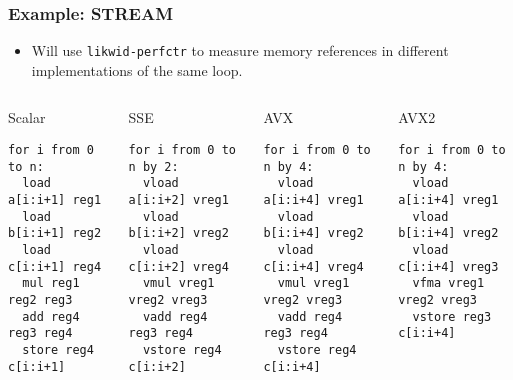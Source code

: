 \documentclass[presentation,aspectratio=43,10pt]{beamer}
\begin{document}
\begin{frame}[fragile]
  \frametitle{Example: STREAM}
  \begin{itemize}
  \item Will use \texttt{likwid-perfctr} to measure memory references
    in different implementations of the same loop.
  \end{itemize}
  \begin{columns}[t]
    \begin{column}{0.25\textwidth}
      \begin{block}{Scalar}
\begin{verbatim}
for i from 0 to n:
  load a[i:i+1] reg1
  load b[i:i+1] reg2
  load c[i:i+1] reg4
  mul reg1 reg2 reg3
  add reg4 reg3 reg4
  store reg4 c[i:i+1]
\end{verbatim}
      \end{block}
    \end{column}
    \begin{column}{0.25\textwidth}
      \begin{block}{SSE}
\begin{verbatim}
for i from 0 to n by 2:
  vload a[i:i+2] vreg1
  vload b[i:i+2] vreg2
  vload c[i:i+2] vreg4
  vmul vreg1 vreg2 vreg3
  vadd reg4 reg3 reg4
  vstore reg4 c[i:i+2]
\end{verbatim}
      \end{block}
    \end{column}
    \begin{column}{0.25\textwidth}
      \begin{block}{AVX}
\begin{verbatim}
for i from 0 to n by 4:
  vload a[i:i+4] vreg1
  vload b[i:i+4] vreg2
  vload c[i:i+4] vreg4
  vmul vreg1 vreg2 vreg3
  vadd reg4 reg3 reg4
  vstore reg4 c[i:i+4]
\end{verbatim}
      \end{block}
    \end{column}
    \begin{column}{0.25\textwidth}
      \begin{block}{AVX2}
\begin{verbatim}
for i from 0 to n by 4:
  vload a[i:i+4] vreg1
  vload b[i:i+4] vreg2
  vload c[i:i+4] vreg3
  vfma vreg1 vreg2 vreg3
  vstore reg3 c[i:i+4]
\end{verbatim}
      \end{block}
    \end{column}
  \end{columns}
\end{frame}
\end{document}
